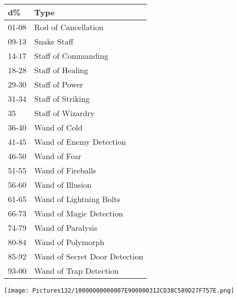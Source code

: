 \documentclass[a4paper,twoside,openany,10pt]{book}
\begin{document}
\begin{multicols}{2}
\begin{tabular*}{0.93\linewidth}{@{\extracolsep{\fill}}ll}
\textbf{d\%} & \textbf{Type} \\\toprule
01-08 & Rod of Cancellation \\\hline
09-13 & Snake Staff \\\hline
14-17 & Staff of Commanding \\\hline
18-28 & Staff of Healing \\\hline
29-30 & Staff of Power \\\hline
31-34 & Staff of Striking \\\hline
35 & Staff of Wizardry \\\hline
36-40 & Wand of Cold \\\hline
41-45 & Wand of Enemy Detection \\\hline
46-50 & Wand of Fear \\\hline
51-55 & Wand of Fireballs \\\hline
56-60 & Wand of Illusion \\\hline
61-65 & Wand of Lightning Bolts \\\hline
66-73 & Wand of Magic Detection \\\hline
74-79 & Wand of Paralysis \\\hline
80-84 & Wand of Polymorph \\\hline
85-92 & Wand of Secret Door Detection \\\hline
93-00 & Wand of Trap Detection \\\bottomrule
\end{tabular*}

\end{multicols}

\vfill

 \texttt{[image: Pictures132/10000000000007E900000312CD38C589D27F757E.png]} 
 
 \pagebreak
 
\end{document}
